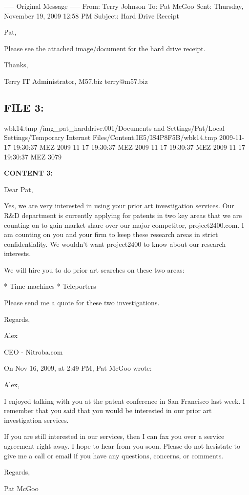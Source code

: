 ----- Original Message -----
From: Terry Johnson
To: Pat McGoo
Sent: Thursday, November 19, 2009 12:58 PM
Subject: Hard Drive Receipt

Pat,

Please see the attached image/document for the hard drive receipt.

Thanks,

Terry
IT Administrator, M57.biz
terry@m57.biz

\subsection{FILE 3:}
wbk14.tmp	/img_pat_harddrive.001/Documents and Settings/Pat/Local Settings/Temporary Internet Files/Content.IE5/IS4P8F5B/wbk14.tmp		2009-11-17 19:30:37 MEZ	2009-11-17 19:30:37 MEZ	2009-11-17 19:30:37 MEZ	2009-11-17 19:30:37 MEZ	3079	

\textbf{CONTENT 3:}

Dear Pat,

Yes, we are very interested in using your prior art investigation services. 
Our R&D department is currently applying for patents in two key areas that 
we are counting on to gain market share over our major competitor, 
project2400.com. I am counting on you and your firm to keep these research 
areas in strict confidentiality. We wouldn't want project2400 to know about 
our research interests.

We will hire you to do prior art searches on these two areas:

* Time machines
* Teleporters

Please send me a quote for these two investigations.

Regards,

Alex

CEO - Nitroba.com


On Nov 16, 2009, at 2:49 PM, Pat McGoo wrote:


Alex,

I enjoyed talking with you at the patent conference in San Francisco
last week.  I remember that you said that you would be interested in
our prior art investigation services.

If you are still interested in our services, then I can fax you over a
service agreement right away.  I hope to hear from you soon.  Please do
not hesistate to give me a call or email if you have any questions,
concerns, or comments.

Regards,

Pat McGoo


